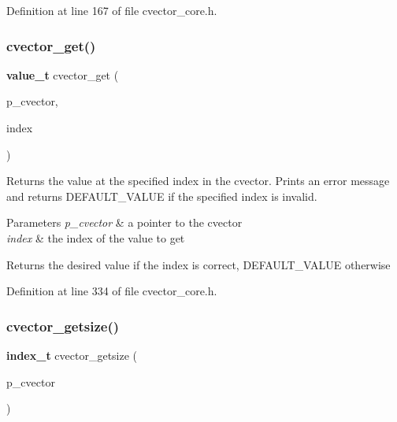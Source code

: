 Definition at line 167 of file cvector\+\_\+core.\+h.

\mbox{\label{cvector__interface_8h_af9a92765b9a85699a7acba0c51ac8620}} 
\subsubsection{cvector\+\_\+get()}
{\footnotesize\ttfamily \textbf{ value\+\_\+t} cvector\+\_\+get (\begin{DoxyParamCaption}\item[{\textbf{ cvector} $\ast$}]{p\+\_\+cvector,  }\item[{\textbf{ index\+\_\+t}}]{index }\end{DoxyParamCaption})}

Returns the value at the specified index in the cvector. Prints an error message and returns D\+E\+F\+A\+U\+L\+T\+\_\+\+V\+A\+L\+UE if the specified index is invalid. 
\begin{DoxyParams}{Parameters}
{\em p\+\_\+cvector} & a pointer to the cvector \\
\hline
{\em index} & the index of the value to get \\
\hline
\end{DoxyParams}
\begin{DoxyReturn}{Returns}
the desired value if the index is correct, D\+E\+F\+A\+U\+L\+T\+\_\+\+V\+A\+L\+UE otherwise 
\end{DoxyReturn}


Definition at line 334 of file cvector\+\_\+core.\+h.

\mbox{\label{cvector__interface_8h_a069c279e9bce4acc6a357862b100ead7}} 
\subsubsection{cvector\+\_\+getsize()}
{\footnotesize\ttfamily \textbf{ index\+\_\+t} cvector\+\_\+getsize (\begin{DoxyParamCaption}\item[{\textbf{ cvector} $\ast$}]{p\+\_\+cvector }\end{DoxyParamCaption})}

